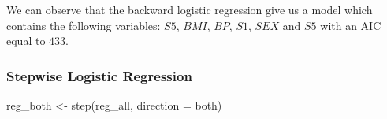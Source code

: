 \documentclass[
]{article}
\newenvironment{Shaded}{\begin{snugshade}}{\end{snugshade}}
\newcommand{\AttributeTok}[1]{\textcolor[rgb]{0.77,0.63,0.00}{#1}}
\newcommand{\FunctionTok}[1]{\textcolor[rgb]{0.00,0.00,0.00}{#1}}
\newcommand{\NormalTok}[1]{#1}
\newcommand{\OtherTok}[1]{\textcolor[rgb]{0.56,0.35,0.01}{#1}}
\newcommand{\StringTok}[1]{\textcolor[rgb]{0.31,0.60,0.02}{#1}}
\begin{document}
We can observe that the backward logistic regression give us a model
which contains the following variables: \(S5\), \(BMI\), \(BP\), \(S1\),
\(SEX\) and \(S5\) with an AIC equal to \(433\).

\hypertarget{stepwise-logistic-regression}{%
\subsubsection{Stepwise Logistic
Regression}\label{stepwise-logistic-regression}}

\begin{Shaded}
\begin{Highlighting}[]
\NormalTok{reg\_both }\OtherTok{\textless{}{-}} \FunctionTok{step}\NormalTok{(reg\_all, }\AttributeTok{direction =} \StringTok{\textquotesingle{}both\textquotesingle{}}\NormalTok{)}
\end{Highlighting}
\end{Shaded}
\end{document}

